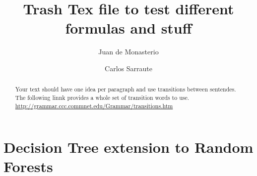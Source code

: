 \documentclass{article}%
\newcommand{\Expect}{{\mathbb{E}}}
\newtheorem{definition}{Definition}[subsection]
\theoremstyle{definition}
\begin{document}
\title{Trash Tex file to test different formulas and stuff}




\author{
	Juan de Monasterio
	\and Carlos Sarraute
}

%
%


\maketitle
\begin{abstract}
	Your text should have one idea per paragraph and use transitions between sentendes. The following linnk provides a whole set of transition words to use.
	\url{http://grammar.ccc.commnet.edu/Grammar/transitions.htm}
	
	



\end{abstract} 




\section{Decision Tree extension to Random Forests}\label{section-randomForests}
\end{document}
